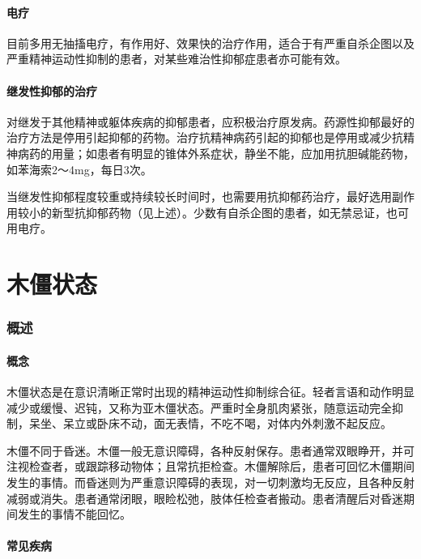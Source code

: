 \paragraph{电疗}

目前多用无抽搐电疗，有作用好、效果快的治疗作用，适合于有严重自杀企图以及严重精神运动性抑制的患者，对某些难治性抑郁症患者亦可能有效。

\paragraph{继发性抑郁的治疗}

对继发于其他精神或躯体疾病的抑郁患者，应积极治疗原发病。药源性抑郁最好的治疗方法是停用引起抑郁的药物。治疗抗精神病药引起的抑郁也是停用或减少抗精神病药的用量；如患者有明显的锥体外系症状，静坐不能，应加用抗胆碱能药物，如苯海索2～4mg，每日3次。

当继发性抑郁程度较重或持续较长时间时，也需要用抗抑郁药治疗，最好选用副作用较小的新型抗抑郁药物（见上述）。少数有自杀企图的患者，如无禁忌证，也可用电疗。

\protect\hypertarget{text00046.html}{}{}

\section{木僵状态}

\subsubsection{概述}

\paragraph{概念}

木僵状态是在意识清晰正常时出现的精神运动性抑制综合征。轻者言语和动作明显减少或缓慢、迟钝，又称为亚木僵状态。严重时全身肌肉紧张，随意运动完全抑制，呆坐、呆立或卧床不动，面无表情，不吃不喝，对体内外刺激不起反应。

木僵不同于昏迷。木僵一般无意识障碍，各种反射保存。患者通常双眼睁开，并可注视检查者，或跟踪移动物体；且常抗拒检查。木僵解除后，患者可回忆木僵期间发生的事情。而昏迷则为严重意识障碍的表现，对一切刺激均无反应，且各种反射减弱或消失。患者通常闭眼，眼睑松弛，肢体任检查者搬动。患者清醒后对昏迷期间发生的事情不能回忆。

\paragraph{常见疾病}


